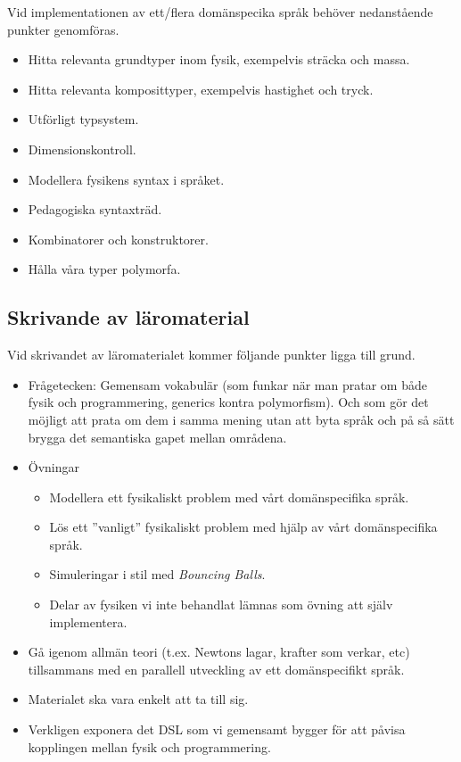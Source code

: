 \documentclass[12pt,a4paper]{article}
\begin{document}
Vid implementationen av ett/flera domänspecika språk behöver nedanstående punkter genomföras.

\begin{itemize}
    \item Hitta relevanta grundtyper inom fysik, exempelvis sträcka och massa.
    \item Hitta relevanta komposittyper, exempelvis hastighet och tryck.
    \item Utförligt typsystem.
    \item Dimensionskontroll.
    \item Modellera fysikens syntax i språket.
    \item Pedagogiska syntaxträd.
    \item Kombinatorer och konstruktorer.
    \item Hålla våra typer polymorfa.
\end{itemize}

\subsection{Skrivande av läromaterial}

Vid skrivandet av läromaterialet kommer följande punkter ligga till grund.

\begin{itemize}
    \item Frågetecken: Gemensam vokabulär (som funkar när man pratar om både fysik och programmering, generics kontra polymorfism). Och som gör det möjligt att prata om dem i samma mening utan att byta språk och på så sätt brygga det semantiska gapet mellan områdena.
    \item Övningar
        \begin{itemize}
            \item Modellera ett fysikaliskt problem med vårt domänspecifika språk.
            \item Lös ett ''vanligt'' fysikaliskt problem med hjälp av vårt domänspecifika språk.
            \item Simuleringar i stil med \textit{Bouncing Balls}.
            \item Delar av fysiken vi inte behandlat lämnas som övning att själv implementera.
        \end{itemize}
    \item Gå igenom allmän teori (t.ex. Newtons lagar, krafter som verkar, etc) tillsammans med en parallell utveckling av ett domänspecifikt språk.
    \item Materialet ska vara enkelt att ta till sig.
    \item Verkligen exponera det DSL som vi gemensamt bygger för att påvisa kopplingen mellan fysik och programmering.
\end{itemize}
\end{document}
